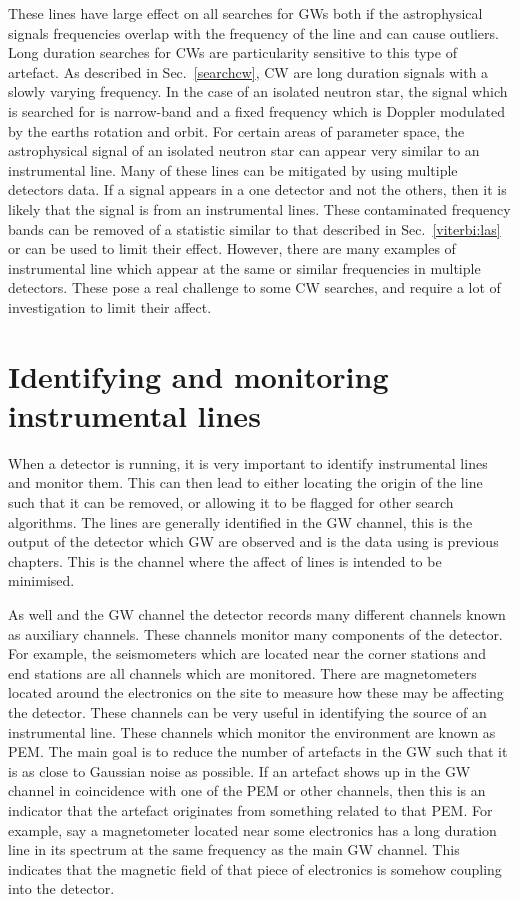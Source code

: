These lines have large effect on all searches for \acp{GW} both if the astrophysical signals frequencies overlap with the frequency of the line and can cause outliers. 
Long duration searches for \acp{CW} are particularity sensitive to this type of artefact.
As described in Sec.~\ref{searchcw}, \ac{CW} are long duration signals with a slowly varying frequency.
In the case of an isolated neutron star, the signal which is searched for is narrow-band and a fixed frequency which is Doppler modulated by the earths rotation and orbit.
For certain areas of parameter space, the astrophysical signal of an isolated neutron star can appear very similar to an instrumental line. 
Many of these lines can be mitigated by using multiple detectors data. If a signal appears in a one detector and not the others, then it is likely that the signal is from an instrumental lines. 
These contaminated frequency bands can be removed of a statistic similar to that described in Sec.~\ref{viterbi:las} or \citep{keitel2014SearchContinuous} can be used to limit their effect.
However, there are many examples of instrumental line which appear at the same or similar frequencies in multiple detectors.
These pose a real challenge to some \ac{CW} searches, and require a lot of investigation to limit their affect.

\section{\label{detchar:monitor}Identifying and monitoring instrumental lines}

When a detector is running, it is very important to identify instrumental lines and monitor them.
This can then lead to either locating the origin of the line such that it can be removed, or allowing it to be flagged for other search algorithms.
The lines are generally identified in the \ac{GW} channel, this is the output of the detector which \ac{GW} are observed and is the data using is previous chapters.
This is the channel where the affect of lines is intended to be minimised.

As well and the \ac{GW} channel the detector records many different channels known as auxiliary channels. 
These channels monitor many components of the detector.
For example, the seismometers which are located near the corner stations and end stations are all channels which are monitored. 
There are magnetometers located around the electronics on the site to measure how these may be affecting the detector. 
These channels can be very useful in identifying the source of an instrumental line.
These channels which monitor the environment are known as \ac{PEM}.
The main goal is to reduce the number of artefacts in the \ac{GW} such that it is as close to Gaussian noise as possible.
If an artefact shows up in the \ac{GW} channel in coincidence with one of the \ac{PEM} or other channels, then this is an indicator that the artefact originates from something related to that \ac{PEM}.
For example, say a magnetometer located near some electronics has a long duration line in its spectrum at the same frequency as the main \ac{GW} channel. 
This indicates that the magnetic field of that piece of electronics is somehow coupling into the detector. 

